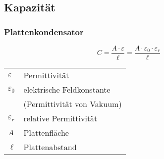 



\subsection{Kapazität}
\subsubsection{Plattenkondensator}
\[ C = \frac{A \cdot \varepsilon}{\ell} 
= \frac{A \cdot \varepsilon_0 \cdot \varepsilon_r}{\ell} \]
\begin{tabular}{lp{}}
$\varepsilon$&Permittivität\\
$\varepsilon_0$&elektrische Feldkonstante\\
&(Permittivität von Vakuum)\\
$\varepsilon_r$&relative Permittivität\\
$A$&Plattenfläche\\
$\ell$&Plattenabstand
\end{tabular}